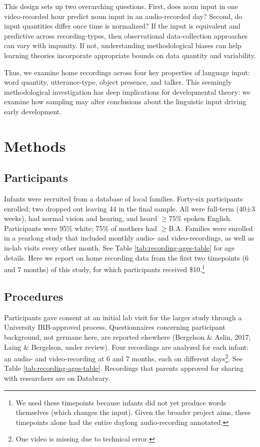 \documentclass[man]{apa6}
\theoremstyle{definition}
\theoremstyle{definition}
\theoremstyle{definition}
\theoremstyle{remark}
\begin{document}
This design sets up two overarching questions. First, does noun input in
one video-recorded hour predict noun input in an audio-recorded day?
Second, do input quantities differ once time is normalized? If the input
is equivalent and predictive across recording-types, then observational
data-collection approaches can vary with impunity. If not, understanding
methodological biases can help learning theories incorporate appropriate
bounds on data quantity and variability.

Thus, we examine home recordings across four key properties of language
input: word quantity, utterance-type, object presence, and talker. This
seemingly methodological investigation has deep implications for
developmental theory: we examine how sampling may alter conclusions
about the linguistic input driving early development.

\section{Methods}\label{methods}

\subsection{Participants}\label{participants}

Infants were recruited from a database of local families. Forty-six
participants enrolled; two dropped out leaving 44 in the final sample.
All were full-term (40±3 weeks), had normal vision and hearing, and
heard \(\geq 75\%\) spoken English. Participants were 95\% white; 75\%
of mothers had \(\geq\)B.A. Families were enrolled in a yearlong study
that included monthly audio- and video-recordings, as well as in-lab
visits every other month. See Table \ref{tab:recording-ages-table} for
age details. Here we report on home recording data from the first two
timepoints (6 and 7 months) of this study, for which participants
received
\$10.\footnote{We used these timepoints because infants did not yet produce words themselves (which changes the input). Given the broader project aims, these timepoints alone had the entire daylong audio-recording annotated.}

\subsection{Procedures}\label{procedures}

Participants gave consent at an initial lab visit for the larger study
through a University IRB-approved process. Questionnaires concerning
participant background, not germane here, are reported elsewhere
(Bergelson \& Aslin, 2017; Laing \& Bergelson, under review). Four
recordings are analyzed for each infant: an audio- and video-recording
at 6 and 7 months, each on different
days\footnote{One video is missing due to technical error.}. See Table
\ref{tab:recording-ages-table}. Recordings that parents approved for
sharing with researchers are on Databrary.
\end{document}
